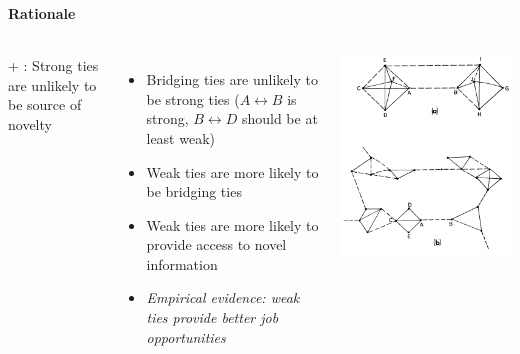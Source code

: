 \documentclass[8pt]{beamer}
\begin{document}
\begin{frame}
\frametitle{\insertsection}
\framesubtitle{Rationale}
	
\begin{columns}[c]
{\color{blue}{Premise 1}} + {\color{blue}{Premise 2}}: Strong ties are unlikely to be source of novelty

\begin{itemize}
\item Bridging ties are unlikely to be strong ties ($A \leftrightarrow B$ is strong, $B\leftrightarrow D$ should be at least weak)
\item Weak ties are more likely to be bridging ties
\item Weak ties are more likely to provide access to novel information
\item \textit{Empirical evidence: weak ties provide better job opportunities}
\end{itemize}

\centering
\includegraphics[width=\textwidth]{swt}\\
{\tiny \cite{Granovetter1973}}

\end{columns}	
  


\end{frame}
\end{document}
